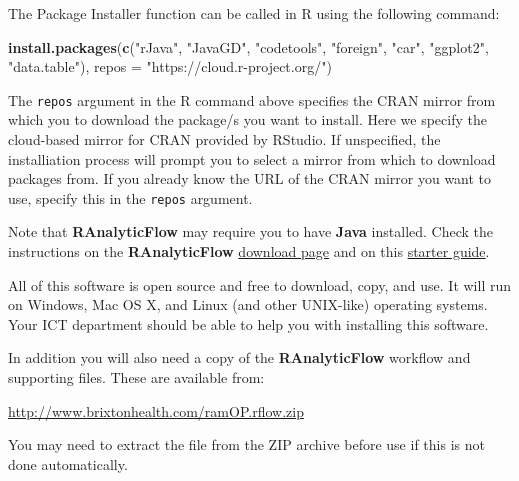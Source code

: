 \documentclass[12pt,]{book}
\newenvironment{Shaded}{\begin{snugshade}}{\end{snugshade}}
\newcommand{\KeywordTok}[1]{\textcolor[rgb]{0.13,0.29,0.53}{\textbf{#1}}}
\newcommand{\DataTypeTok}[1]{\textcolor[rgb]{0.13,0.29,0.53}{#1}}
\newcommand{\StringTok}[1]{\textcolor[rgb]{0.31,0.60,0.02}{#1}}
\newcommand{\NormalTok}[1]{#1}
\theoremstyle{definition}
\theoremstyle{definition}
\theoremstyle{definition}
\theoremstyle{remark}
\begin{document}
The Package Installer function can be called in R using the following
command:

\begin{Shaded}
\begin{Highlighting}[]
\KeywordTok{install.packages}\NormalTok{(}\KeywordTok{c}\NormalTok{(}\StringTok{"rJava"}\NormalTok{, }\StringTok{"JavaGD"}\NormalTok{, }\StringTok{"codetools"}\NormalTok{, }
                   \StringTok{"foreign"}\NormalTok{, }\StringTok{"car"}\NormalTok{, }\StringTok{"ggplot2"}\NormalTok{, }\StringTok{"data.table"}\NormalTok{), }
                   \DataTypeTok{repos =} \StringTok{"https://cloud.r-project.org/"}\NormalTok{)}
\end{Highlighting}
\end{Shaded}

The \texttt{repos} argument in the R command above specifies the CRAN
mirror from which you to download the package/s you want to install.
Here we specify the cloud-based mirror for CRAN provided by RStudio. If
unspecified, the installiation process will prompt you to select a
mirror from which to download packages from. If you already know the URL
of the CRAN mirror you want to use, specify this in the \texttt{repos}
argument.

Note that \textbf{RAnalyticFlow} may require you to have \textbf{Java}
installed. Check the instructions on the \textbf{RAnalyticFlow}
\href{http://r.analyticflow.com/en/download/}{download page} and on this
\href{http://download.ef-prime.com/ranalyticflow/3.1.5/readme.html}{starter
guide}.

All of this software is open source and free to download, copy, and use.
It will run on Windows, Mac OS X, and Linux (and other UNIX-like)
operating systems. Your ICT department should be able to help you with
installing this software.

In addition you will also need a copy of the \textbf{RAnalyticFlow}
workflow and supporting files. These are available from:

\url{http://www.brixtonhealth.com/ramOP.rflow.zip}

You may need to extract the file from the ZIP archive before use if this
is not done automatically.
\end{document}
